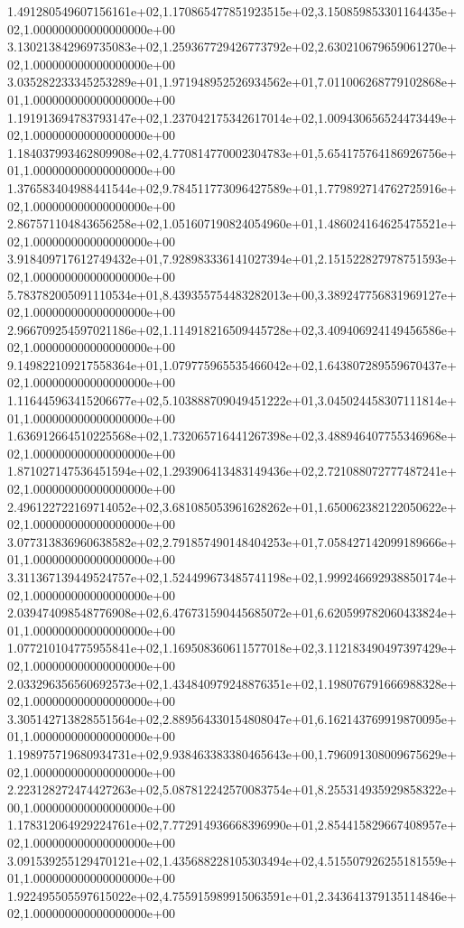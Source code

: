 1.491280549607156161e+02,1.170865477851923515e+02,3.150859853301164435e+02,1.000000000000000000e+00
3.130213842969735083e+02,1.259367729426773792e+02,2.630210679659061270e+02,1.000000000000000000e+00
3.035282233345253289e+01,1.971948952526934562e+01,7.011006268779102868e+01,1.000000000000000000e+00
1.191913694783793147e+02,1.237042175342617014e+02,1.009430656524473449e+02,1.000000000000000000e+00
1.184037993462809908e+02,4.770814770002304783e+01,5.654175764186926756e+01,1.000000000000000000e+00
1.376583404988441544e+02,9.784511773096427589e+01,1.779892714762725916e+02,1.000000000000000000e+00
2.867571104843656258e+02,1.051607190824054960e+01,1.486024164625475521e+02,1.000000000000000000e+00
3.918409717612749432e+01,7.928983336141027394e+01,2.151522827978751593e+02,1.000000000000000000e+00
5.783782005091110534e+01,8.439355754483282013e+00,3.389247756831969127e+02,1.000000000000000000e+00
2.966709254597021186e+02,1.114918216509445728e+02,3.409406924149456586e+02,1.000000000000000000e+00
9.149822109217558364e+01,1.079775965535466042e+02,1.643807289559670437e+02,1.000000000000000000e+00
1.116445963415206677e+02,5.103888709049451222e+01,3.045024458307111814e+01,1.000000000000000000e+00
1.636912664510225568e+02,1.732065716441267398e+02,3.488946407755346968e+02,1.000000000000000000e+00
1.871027147536451594e+02,1.293906413483149436e+02,2.721088072777487241e+02,1.000000000000000000e+00
2.496122722169714052e+02,3.681085053961628262e+01,1.650062382122050622e+02,1.000000000000000000e+00
3.077313836960638582e+02,2.791857490148404253e+01,7.058427142099189666e+01,1.000000000000000000e+00
3.311367139449524757e+02,1.524499673485741198e+02,1.999246692938850174e+02,1.000000000000000000e+00
2.039474098548776908e+02,6.476731590445685072e+01,6.620599782060433824e+01,1.000000000000000000e+00
1.077210104775955841e+02,1.169508360611577018e+02,3.112183490497397429e+02,1.000000000000000000e+00
2.033296356560692573e+02,1.434840979248876351e+02,1.198076791666988328e+02,1.000000000000000000e+00
3.305142713828551564e+02,2.889564330154808047e+01,6.162143769919870095e+01,1.000000000000000000e+00
1.198975719680934731e+02,9.938463383380465643e+00,1.796091308009675629e+02,1.000000000000000000e+00
2.223128272474427263e+02,5.087812242570083754e+01,8.255314935929858322e+00,1.000000000000000000e+00
1.178312064929224761e+02,7.772914936668396990e+01,2.854415829667408957e+02,1.000000000000000000e+00
3.091539255129470121e+02,1.435688228105303494e+02,4.515507926255181559e+01,1.000000000000000000e+00
1.922495505597615022e+02,4.755915989915063591e+01,2.343641379135114846e+02,1.000000000000000000e+00

